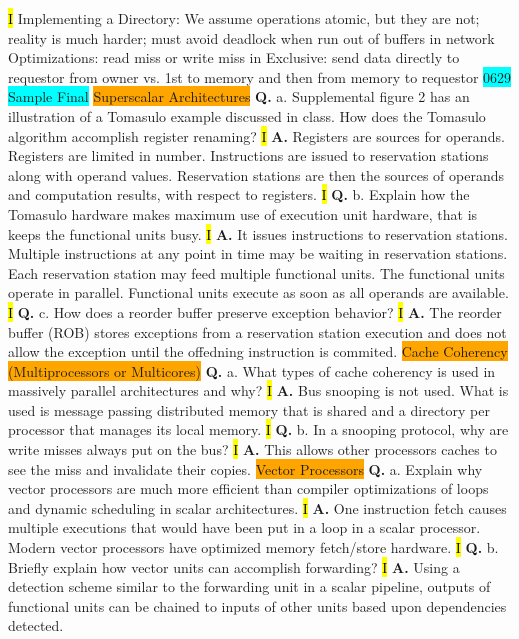 \documentclass[fontsize=4pt]{scrartcl}
\begin{document}
\hl{I}
Implementing a Directory: We assume operations atomic, but they are not; reality is much harder; must avoid deadlock when run out of buffers in network Optimizations: read miss or write miss in Exclusive: send data directly to requestor from owner vs. 1st to memory and then from memory to requestor
\colorbox{Cyan}{0629 Sample Final}
\colorbox{Orange}{Superscalar Architectures}
\textbf{Q.} a. Supplemental figure 2 has an illustration of a Tomasulo example discussed in class. How does the Tomasulo algorithm accomplish register renaming? 
\hl{I}
\textbf{A.} Registers are sources for operands. Registers are limited in number. Instructions are issued to reservation stations along with operand values. Reservation stations are then the sources of operands and computation results, with respect to registers.
\hl{I}
\textbf{Q.} b. Explain how the Tomasulo hardware makes maximum use of execution unit hardware, that is keeps the functional units busy.
\hl{I}
\textbf{A.} It issues instructions to reservation stations. Multiple instructions at any point in time may be waiting in reservation stations. Each reservation station may feed multiple functional units. The functional units operate in parallel. Functional units execute as soon as all operands are available.
\hl{I}
\textbf{Q.} c. How does a reorder buffer preserve exception behavior?
\hl{I}
\textbf{A.} The reorder buffer (ROB) stores exceptions from a reservation station execution and does not allow the exception until the offedning instruction is commited.
\colorbox{Orange}{Cache Coherency (Multiprocessors or Multicores)} 
\textbf{Q.} a. What types of cache coherency is used in massively parallel architectures and why?
\hl{I}
\textbf{A.} Bus snooping is not used. What is used is message passing distributed memory that is shared and a directory per processor that manages its local memory.
\hl{I}
\textbf{Q.} b. In a snooping protocol, why are write misses always put on the bus?
\hl{I}
\textbf{A.} This allows other processors caches to see the miss and invalidate their copies.
\colorbox{Orange}{Vector Processors}
\textbf{Q.} a. Explain why vector processors are much more efficient than compiler optimizations of loops and dynamic scheduling in scalar architectures.
\hl{I}
\textbf{A.} One instruction fetch causes multiple executions that would have been put in a loop in a scalar processor. Modern vector processors have optimized memory fetch/store hardware.
\hl{I}
\textbf{Q.} b. Briefly explain how vector units can accomplish forwarding?
\hl{I}
\textbf{A.} Using  a detection scheme similar to the forwarding unit in a scalar pipeline, outputs of functional units can be chained to inputs of other units based upon dependencies detected.
\end{document}
